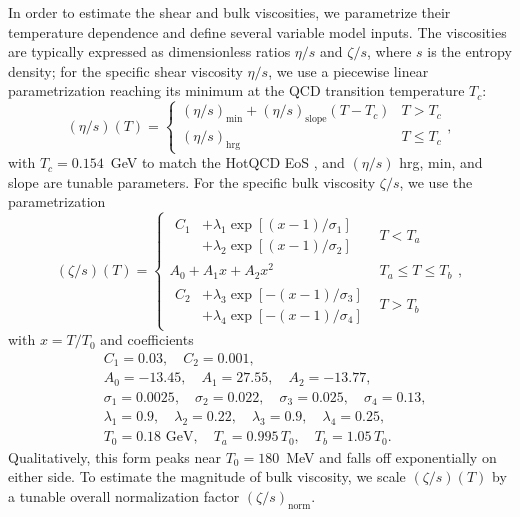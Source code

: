 \documentclass[aps,prc,reprint,amsmath,nofootinbib]{revtex4-1}
\begin{document}
In order to estimate the shear and bulk viscosities, we parametrize their temperature dependence and define several variable model inputs.
The viscosities are typically expressed as dimensionless ratios $\eta/s$ and $\zeta/s$, where $s$ is the entropy density;
for the specific shear viscosity $\eta/s$, we use a piecewise linear parametrization reaching its minimum at the QCD transition temperature $T_c$:
\begin{equation}
  (\eta/s)(T) =
  \begin{cases}
    (\eta/s)_\text{min} + (\eta/s)_\text{slope} (T - T_c) & T > T_c \\
    (\eta/s)_\text{hrg}                                   & T \le T_c
  \end{cases},
  \label{eq:etas}
\end{equation}
with $T_c = 0.154$~GeV to match the HotQCD EoS \cite{Bazavov:2014pvz}, and $(\eta/s)$ hrg, min, and slope are tunable parameters.
For the specific bulk viscosity $\zeta/s$, we use the parametrization \cite{Denicol:2009am, Ryu:2015vwa}
\begin{equation}
  (\zeta/s)(T) =
  \begin{cases}
    \begin{aligned}
      C_1 &+ \lambda_1 \exp [(x-1)/\sigma_1]  \\ &+ \lambda_2 \exp [ (x-1)/\sigma_2]
    \end{aligned}
    &T < T_a \\[3ex]
    A_0 + A_1 x + A_2 x^2 &T_a \le T \le T_b \\[2ex]
    \begin{aligned}
      C_2 &+ \lambda_3 \exp [-(x-1)/\sigma_3]  \\ &+ \lambda_4 \exp [-(x-1)/\sigma_4]
    \end{aligned}
    &T > T_b
  \end{cases},
  \label{eq:zetas}
\end{equation}
with $x = T/T_0$ and coefficients
\begin{align*}
  &C_1=0.03,\quad C_2=0.001, \\
  &A_0=-13.45,\quad A_1=27.55,\quad A_2=-13.77, \\
  &\sigma_1=0.0025,\quad \sigma_2=0.022,\quad \sigma_3=0.025,\quad \sigma_4=0.13, \\
  &\lambda_1=0.9,\quad \lambda_2=0.22,\quad \lambda_3=0.9,\quad \lambda_4=0.25, \\
  &T_0 = 0.18 \text{ GeV},\quad T_a = 0.995\, T_0,\quad T_b = 1.05\, T_0.
\end{align*}
Qualitatively, this form peaks near $T_0 = 180$~MeV and falls off exponentially on either side.
To estimate the magnitude of bulk viscosity, we scale $(\zeta/s)(T)$ by a tunable overall normalization factor $(\zeta/s)_\text{norm}$.
\end{document}
